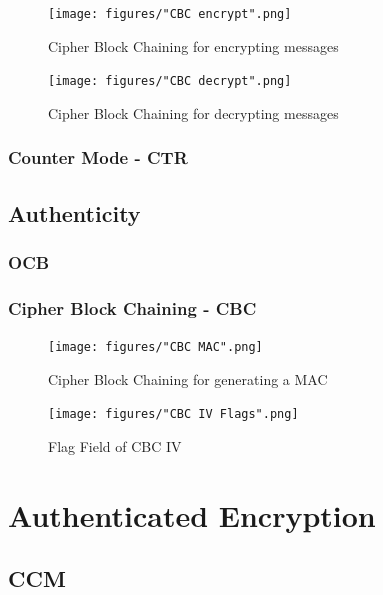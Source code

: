 \begin{figure}
    \centering
    \texttt{[image: figures/"CBC encrypt".png]}
    \caption{Cipher Block Chaining for encrypting messages}
    \label{fig:cbc_encrypt}
\end{figure}

\begin{figure}
    \centering
    \texttt{[image: figures/"CBC decrypt".png]}
    \caption{Cipher Block Chaining for decrypting messages}
    \label{fig:cbc_decrypt}
\end{figure}

\subsubsection{Counter Mode - CTR}

\subsection{Authenticity}\label{authenticity}

\subsubsection{OCB}

\subsubsection{Cipher Block Chaining - CBC}


\begin{figure}\label{cbcMAC}
    \centering
    \texttt{[image: figures/"CBC MAC".png]}
    \caption{Cipher Block Chaining for generating a MAC}
    \label{fig:cbc_MAC}
\end{figure}

\begin{figure}\label{cbcMACFlags}
    \centering
    \texttt{[image: figures/"CBC IV Flags".png]}
    \caption{Flag Field of CBC IV}
    \label{fig:cbc_Flags}
\end{figure}

\section{Authenticated Encryption}\label{authEncrypt}

\subsection{CCM}

